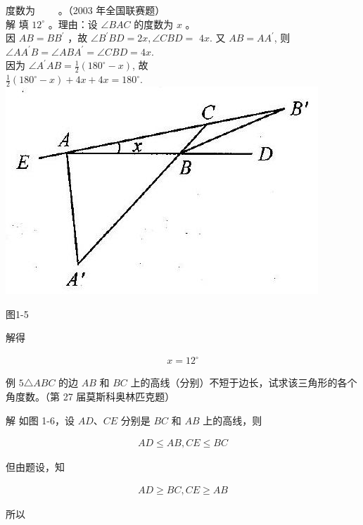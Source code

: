 \documentclass[10pt]{article}
\begin{document}
度数为 $\qquad$。（2003 年全国联赛题）\\
解 填 $12^{\circ}$ 。理由：设 $\angle B A C$ 的度数为 $x$ 。\\
因 $A B=B B^{\prime}$ ，故 $\angle B^{\prime} B D=2 x, \angle C B D=$ $4 x$. 又 $A B=A A^{\prime}$, 则\\
$\angle A A^{\prime} B=\angle A B A^{\prime}=\angle C B D=4 x$.\\
因为 $\angle A^{\prime} A B=\frac{1}{2}\left(180^{\circ}-x\right)$, 故\\
$\frac{1}{2}\left(180^{\circ}-x\right)+4 x+4 x=180^{\circ}$.\\
\includegraphics[max width=\textwidth, center]{2024_10_30_2c8f45efd4a519b08e1ag-010(1)}

图1-5

解得

\begin{align*}
x=12^{\circ}
\end{align*}

例 $5 \triangle A B C$ 的边 $A B$ 和 $B C$ 上的高线（分别）不短于边长，试求该三角形的各个角度数。（第 27 届莫斯科奥林匹克题）

解 如图 1-6，设 $A D 、 C E$ 分别是 $B C$ 和 $A B$ 上的高线，则

\begin{align*}
A D \leqslant A B, C E \leqslant B C
\end{align*}

但由题设，知

\begin{align*}
A D \geqslant B C, C E \geqslant A B
\end{align*}

所以
\end{document}

